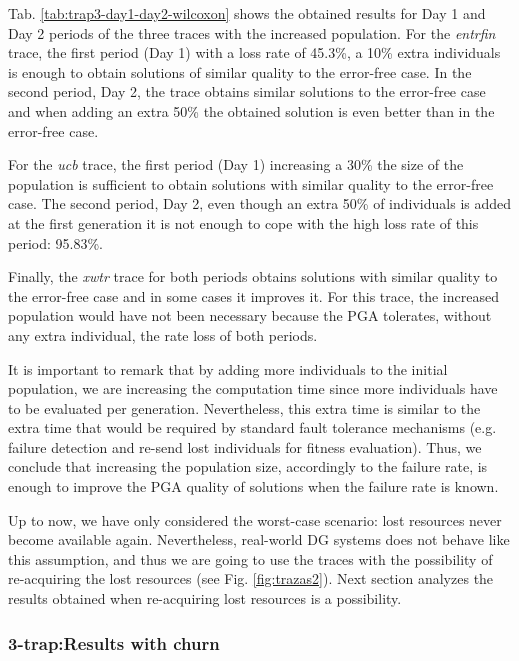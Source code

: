 \documentclass[graybox]{sty/svmult}
\begin{document}
Tab. \ref{tab:trap3-day1-day2-wilcoxon} shows the obtained results for Day 1 and Day 2 periods of the three traces with the
increased population. For the \emph{entrfin} trace, the first period (Day 1) with a loss rate of 45.3\%, a 10\% extra
individuals is enough to obtain solutions of similar quality to the error-free case. In the second period, Day 2, the trace obtains
similar solutions to the error-free case and when adding an extra 50\% the obtained solution is even better than in the
error-free case.

For the \emph{ucb} trace, the first period (Day 1) increasing a 30\% the size of the population is sufficient to obtain solutions with
similar quality to the error-free case. The second period, Day 2, even though an extra 50\% of individuals is added at the first
generation it is not enough to cope with the high loss rate of this period: 95.83\%. 

Finally, the \emph{xwtr} trace for both periods obtains solutions with similar quality to the error-free case and in some cases it improves it.
For this trace, the increased population would have not been necessary because the PGA tolerates, 
without any extra individual, the rate loss of both periods.

It is important to remark that by adding more individuals to the initial population, we are increasing the computation time
since more individuals have to be evaluated per generation. Nevertheless, this extra time is similar to the extra time
that would be required by standard fault tolerance mechanisms (e.g. failure detection and re-send lost individuals for
fitness evaluation). Thus, we conclude that increasing the population size, accordingly to the failure rate, is enough to improve the PGA
quality of solutions when the failure rate is known.

Up to now, we have only considered the worst-case scenario: lost resources never become available again. Nevertheless,
real-world DG systems does not behave like this assumption, and thus we are going to use the traces with the possibility of
re-acquiring the lost resources (see Fig. \ref{fig:trazas2}). Next section analyzes the results obtained when re-acquiring
lost resources is a possibility.

\subsubsection{3-trap:Results with churn}
\end{document}
